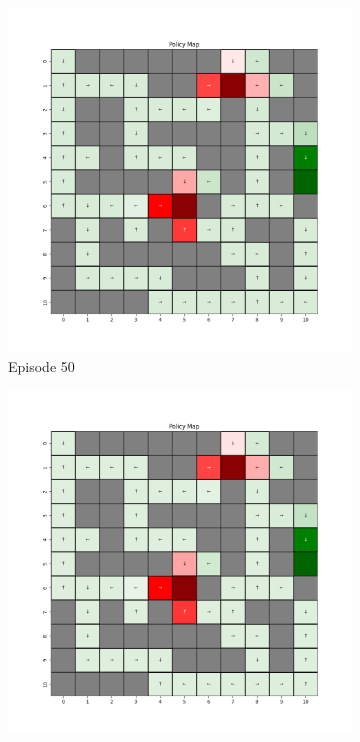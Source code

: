 \documentclass{assignment}
\begin{document}
\begin{figure}[H]
\begin{subfigure}{0.3\textwidth}
        \includegraphics[width=\textwidth]{figures/policy_td/gamma_sweep/policy_alpha_0.1_gamma_0.25_epsilon_0.2_iteration_50.png}
    \caption{Episode 50}
    \end{subfigure}\hfill
    \begin{subfigure}{0.3\textwidth}
        \includegraphics[width=\textwidth]{figures/policy_td/gamma_sweep/policy_alpha_0.1_gamma_0.25_epsilon_0.2_iteration_100.png}

\end{subfigure}
\end{figure}
\end{document}
